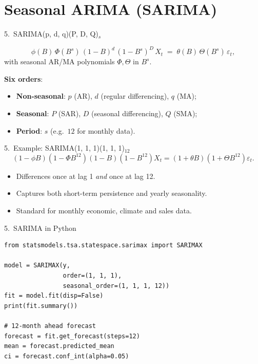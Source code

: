 \documentclass[aspectratio=169]{beamer}
\begin{document}
\section{Seasonal ARIMA (SARIMA)}

\begin{frame}{5.~SARIMA(p, d, q)(P, D, Q)$_s$}
  \begin{defbox}[SARIMA]
    \[
      \phi(B)\, \Phi(B^s)\,
      (1 - B)^d\, (1 - B^s)^D\, X_t
      \;=\; \theta(B)\, \Theta(B^s)\, \varepsilon_t,
    \]
    with seasonal AR/MA polynomials $\Phi, \Theta$ in $B^s$.
  \end{defbox}
  \medskip
  \textbf{Six orders}:
  \begin{itemize}
    \item \textbf{Non-seasonal}: $p$ (AR), $d$ (regular differencing), $q$ (MA);
    \item \textbf{Seasonal}: $P$ (SAR), $D$ (seasonal differencing), $Q$ (SMA);
    \item \textbf{Period}: $s$ (e.g.\ $12$ for monthly data).
  \end{itemize}
\end{frame}

\begin{frame}{5.~Example: SARIMA(1, 1, 1)(1, 1, 1)$_{12}$}
  \[
    (1 - \phi B)(1 - \Phi B^{12})(1 - B)(1 - B^{12}) X_t
    = (1 + \theta B)(1 + \Theta B^{12}) \varepsilon_t.
  \]
  \medskip
  \begin{itemize}
    \item Differences once at lag 1 \emph{and} once at lag 12.
    \item Captures both short-term persistence and yearly seasonality.
    \item Standard for monthly economic, climate and sales data.
  \end{itemize}
\end{frame}

\begin{frame}[fragile]{5.~SARIMA in Python}
\begin{lstlisting}
from statsmodels.tsa.statespace.sarimax import SARIMAX

model = SARIMAX(y,
                order=(1, 1, 1),
                seasonal_order=(1, 1, 1, 12))
fit = model.fit(disp=False)
print(fit.summary())

# 12-month ahead forecast
forecast = fit.get_forecast(steps=12)
mean = forecast.predicted_mean
ci = forecast.conf_int(alpha=0.05)
\end{lstlisting}
\end{frame}
\end{document}
